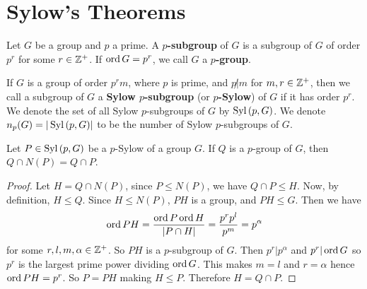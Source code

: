 \section{Sylow's Theorems}

\begin{definition}
    Let $G$ be a group and $p$ a prime. A  \textbf{$p$-subgroup} of $G$ is a
    subgroup of $G$ of order  $p^r$ for some $r \in \mathbb{Z}^+$. If $\operatorname{ord}{G}=p^r$, we
    call  $G$ a  \textbf{$p$-group}.
\end{definition}

\begin{definition}
    If $G$ is a group of order  $p^rm$, where  $p$ is prime, and  $p \not| m$
    for  $m,r \in \mathbb{Z}^+$, then we call a subgroup of $G$ a \textbf{Sylow
    $p$-subgroup} (or \textbf{$p$-Sylow}) of $G$ if it has order $p^r$. We
    denote the set of all Sylow $p$-subgroups of $G$ by  $\operatorname{Syl}{(p,G)}$. We
    denote $n_p(G)=|\operatorname{Syl}{(p,G)}|$ to be the number of Sylow $p$-subgroups of
    $G$.
\end{definition}

\begin{lemma}\label{4.5.1}
    Let $P \in \operatorname{Syl}{(p,G)}$ be a $p$-Sylow of a group  $G$. If  $Q$ is a
    $p$-group of  $G$, then  $Q \cap N(P)=Q \cap P$.
\end{lemma}
\begin{proof}
    Let $H=Q \cap N(P)$, since $P \leq N(P)$, we have $Q \cap P \leq H$. Now, by
    definition, $H \leq Q$. Since $H \leq N(P)$, $PH$ is a group, and  $PH \leq
    G$. Then we have
    \begin{equation*}
        \operatorname{ord}{PH}=\frac{\operatorname{ord}{P}\operatorname{ord}{H}}{|P \cap H|}=\frac{p^rp^l}{p^m}=p^\alpha
    \end{equation*}
    for some $r,l,m,\alpha \in \mathbb{Z}^+$. So $PH$ is a  $p$-subgroup of  $G$. Then
    $p^r|p^\alpha$ and  $p^r|\operatorname{ord}{G}$ so $p^r$ is the largest prime power
    dividing  $\operatorname{ord}{G}$. This makes $m=l$ and $r=\alpha$ hence $\operatorname{ord}{PH}=p^r$.
    So $P=PH$ making $H \leq P$. Therefore $H=Q \cap P$.
\end{proof}

